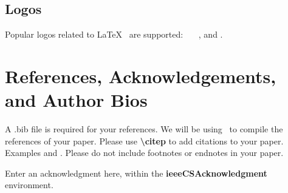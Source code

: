 \documentclass[hasAbstract,authorBox]{csmagazine}
\begin{document}
\subsection{Logos}

Popular logos related to \LaTeX~ are supported: \AllTeX\ \BibLaTeX\ \XeLaTeX\ , and .


\section{References, Acknowledgements, and Author Bios}

A .bib file is required for your references. We will be using \BibTeX\ to compile the references of your paper. Please use \textbf{\textbackslash{}citep{}} to add citations to your paper. Examples \citep{Lamport1994a} and \citep{Goossens1997}. Please do not include footnotes or endnotes in your paper. \citep{Lamport1994a, Goossens1997}




\begin{ieeecsAcknowledgment}
Enter an acknowledgment here, within the \textbf{ieeeCSAcknowledgment} environment.
\end{ieeecsAcknowledgment}	







\end{document}
